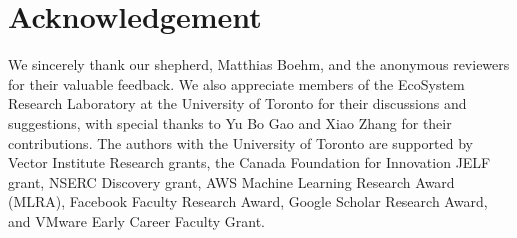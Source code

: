 \section{Acknowledgement}
We sincerely thank our shepherd, Matthias Boehm, and the anonymous reviewers for their valuable feedback.
We also appreciate members of the EcoSystem Research Laboratory at the University of Toronto for their discussions and suggestions, with special thanks to Yu Bo Gao and Xiao Zhang for their contributions.
The authors with the University of Toronto are supported by Vector Institute Research grants, the Canada Foundation for Innovation JELF grant, NSERC Discovery grant, AWS Machine Learning Research Award (MLRA), Facebook Faculty Research Award, Google Scholar Research Award, and VMware Early Career Faculty Grant.
